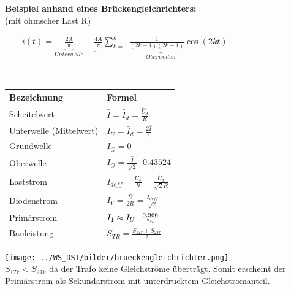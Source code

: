 	\begin{minipage}[c]{8cm} 
	   \textbf{Beispiel anhand eines Brückengleichrichters:}	  	\\
	   (mit ohmscher Last R)
	\end{minipage}   
	\begin{minipage}[c]{10cm} 	
	   $ \qquad i(t) = \underbrace{\frac{2A}{\pi}}_{Unterwelle} - \underbrace{\frac{4A}{\pi} \sum\limits_{k=1}^n \frac{1}{(2k-1)(2k+1)} \cos(2kt)}_{Oberwellen} $
	\end{minipage}\\
\begin{minipage}[c]{10cm}  
		\begin{tabular}{| l | l |}
    		\hline 
      		\textbf{Bezeichnung}
      		& \textbf{Formel} \\
      		\hline
      		Scheitelwert 
      		& $\hat{I} = \hat{I}_d = \frac{\hat{U}_d}{R} $ \\
      		Unterwelle (Mittelwert)
      		& $I_U = \bar{I}_d = \frac{2 \hat{I}}{\pi}$ \\
      		Grundwelle
      		& $I_G = 0$ \\
      		Oberwelle
      		& $I_O = \frac{\hat{I}}{\sqrt{2}} \cdot 0.43524$ \\
      		Laststrom
      		& $I_{d eff} =  \frac{U_s}{R}= \frac{\hat{U}_d}{\sqrt{2}R}$ \\ 
      		Diodenstrom
      		& $I_{V} = \frac{\hat{U}}{2 R} = \frac{I_{d eff}}{\sqrt{2}}$ \\
      		Prim\"arstrom
      		& $I_1 \approx I_U \cdot \frac{0.966}{"u}$ \\
      		Bauleistung 
      		& $S_{TR} = \frac{S_{1Tr} + S_{2Tr}}{2}$ \\
      		\hline
    	\end{tabular}
	\end{minipage}   
	\begin{minipage}[c]{8cm}  
			\texttt{[image: ../WS\_DST/bilder/brueckengleichrichter.png]}  \\			
	$S_{1Tr} < S_{2Tr}$ da der Trafo keine Gleichstr\"ome übertr\"agt. Somit erscheint der Prim\"arstrom
	als Sekund\"arstrom mit unterdrücktem Gleichstromanteil.			
	\end{minipage}
